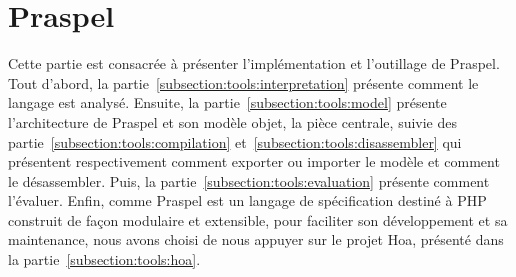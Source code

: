 \section{Praspel}
\label{section:tools:praspel}

Cette partie est consacrée à présenter l'implémentation et l'outillage de
Praspel. Tout d'abord, la partie~\ref{subsection:tools:interpretation} présente
comment le langage est analysé. Ensuite, la partie~\ref{subsection:tools:model}
présente l'architecture de Praspel et son modèle objet, la pièce centrale,
suivie des partie~\ref{subsection:tools:compilation}
et~\ref{subsection:tools:disassembler} qui présentent respectivement comment
exporter ou importer le modèle et comment le désassembler. Puis, la
partie~\ref{subsection:tools:evaluation} présente comment l'évaluer. Enfin,
comme Praspel est un langage de spécification destiné à PHP construit de façon
modulaire et extensible, pour faciliter son développement et sa maintenance,
nous avons choisi de nous appuyer sur le projet Hoa, présenté dans la
partie~\ref{subsection:tools:hoa}.


